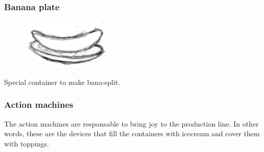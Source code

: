\documentclass[a4paper]{scrartcl}
\begin{document}
        \subsubsection{Banana plate}
            \begin{minipage}[t][2em][t]{\textwidth}
                \begin{figure}
                    \vspace{-20pt}
                    \includegraphics[scale=1]{devices/banana_plate}
                    \vspace{-25pt}
                \end{figure}

                Special container to make bana-split.
            \end{minipage}

    \subsubsection{Action machines}
        The action machines are responsable to bring joy to the production line.
        In other words, these are the devices that fill the containers with
        icecream and cover them with toppings.
\end{document}
